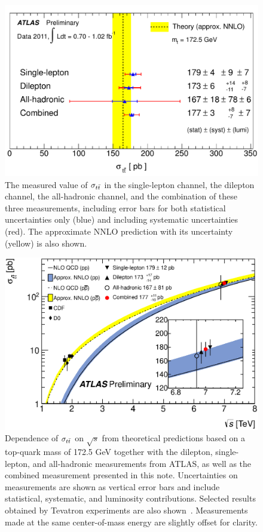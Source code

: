 \begin{figure}[ht!]
  \begin{center}
    \includegraphics[width=.8\textwidth]{figures/comb/summary_summary_atlprelim}
    \caption{The measured value of $\sigma_{t\bar{t}}$ in the single-lepton channel, the dilepton channel, the all-hadronic channel, and the combination of these three measurements, including error bars for both statistical uncertainties only (blue) and including systematic uncertainties (red).  The approximate NNLO prediction with its uncertainty (yellow) is also shown.}
    \label{fig:summary_summary}
  \end{center}
\end{figure}


\begin{figure}[ht!]
  \begin{center}
    \includegraphics[width=.8\textwidth]{figures/comb/top_crosssection_rootS.eps}
    \caption{Dependence of $\sigma_{t\bar{t}}$ on $\sqrt{s}$ from theoretical predictions based on a top-quark mass of 172.5 GeV together with the dilepton, single-lepton, and all-hadronic measurements from ATLAS, as well as the combined measurement presented in this note.  Uncertainties on measurements are shown as vertical error bars and include statistical, systematic, and luminosity contributions.  Selected results obtained by Tevatron experiments are also shown~\cite{CDF1p8,CDF2p6,D01p8,D04p3}. Measurements made at the same center-of-mass energy are slightly offset for clarity. }
    \label{fig:xsec_vs_roots}
  \end{center}
\end{figure}



